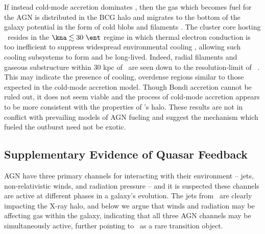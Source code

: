 \documentclass[useAMS,usenatbib]{mn2e}
\begin{document}
If instead cold-mode accretion dominates \citep{pizzolato05}, then the
gas which becomes fuel for the AGN is distributed in the BCG halo and
migrates to the bottom of the galaxy potential in the form of cold
blobs and filaments \citep{2010MNRAS.408..961P}. The cluster core
hosting \irs\ resides in the $\kna \la 30 ~\ent$ regime in which
thermal electron conduction is too inefficient to suppress widespread
environmental cooling \citep{conduction}, allowing such cooling
subsystems to form and be long-lived. Indeed, radial filaments and
gaseous substructure within 30 kpc of \irs\ are seen down to the
resolution-limit of \hst\ \citep{1999Ap&SS.266..113A}. This may
indicate the presence of cooling, overdense regions similar to those
expected in the cold-mode accretion model. Though Bondi accretion
cannot be ruled out, it does not seem viable and the process of
cold-mode accretion appears to be more consistent with the properties
of \irs's halo. These results are not in conflict with prevailing
models of AGN fueling and suggest the mechanism which fueled the
outburst need not be exotic.

\subsection{Supplementary Evidence of Quasar Feedback}

AGN have three primary channels for interacting with their environment
-- jets, non-relativistic winds, and radiation pressure -- and it is
suspected these channels are active at different phases in a galaxy's
evolution. The jets from \irs\ are clearly impacting the X-ray halo,
and below we argue that winds and radiation may be affecting gas
within the galaxy, indicating that all three AGN channels may be
simultaneously active, further pointing to \irs\ as a rare transition
object.
\end{document}

